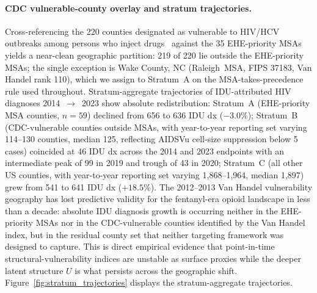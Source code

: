 \documentclass[12pt]{article}
\begin{document}
\paragraph{CDC vulnerable-county overlay and stratum trajectories.} Cross-referencing the 220 counties designated as vulnerable to HIV/HCV outbreaks among persons who inject drugs~\cite{cdc220counties} against the 35 EHE-priority MSAs yields a near-clean geographic partition: 219 of 220 lie outside the EHE-priority MSAs; the single exception is Wake County, NC (Raleigh~MSA, FIPS 37183, Van Handel rank 110), which we assign to Stratum~A on the MSA-takes-precedence rule used throughout. Stratum-aggregate trajectories of IDU-attributed HIV diagnoses 2014~$\to$~2023 show absolute redistribution: Stratum~A (EHE-priority MSA counties, $n = 59$) declined from 656 to 636 IDU dx ($-3.0\%$); Stratum~B (CDC-vulnerable counties outside MSAs, with year-to-year reporting set varying 114--130 counties, median 125, reflecting AIDSVu cell-size suppression below 5 cases) coincided at 46 IDU dx across the 2014 and 2023 endpoints with an intermediate peak of 99 in 2019 and trough of 43 in 2020; Stratum~C (all other US counties, with year-to-year reporting set varying 1{,}868--1{,}964, median 1{,}897) grew from 541 to 641 IDU dx ($+18.5\%$). The 2012--2013 Van Handel vulnerability geography has lost predictive validity for the fentanyl-era opioid landscape in less than a decade: absolute IDU diagnosis growth is occurring neither in the EHE-priority MSAs nor in the CDC-vulnerable counties identified by the Van Handel index, but in the residual county set that neither targeting framework was designed to capture. This is direct empirical evidence that point-in-time structural-vulnerability indices are unstable as surface proxies while the deeper latent structure $U$ is what persists across the geographic shift. Figure~\ref{fig:stratum_trajectories} displays the stratum-aggregate trajectories.
\end{document}
